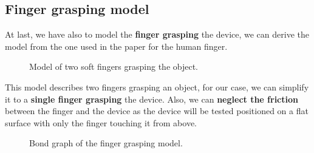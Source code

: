 \subsection{Finger grasping model}
\begin{samepage}
    At last, we have also to model the \textbf{finger grasping} the device, we can derive the model from the one used in the paper \cite{Finger_grasping_model} for the human finger.
    \nopagebreak

    \begin{figure}[H]
        \centering
        \caption{Model of two soft fingers grasping the object.}
        \label{fig: Finger_grasping_model}
    \end{figure}
\end{samepage}

This model describes two fingers grasping an object, for our case, we can simplify it to a \textbf{single finger grasping} the device.
Also, we can \textbf{neglect the friction} between the finger and the device as the device will be tested positioned on a flat surface with only the finger touching it from above.
\begin{figure}[H]
    \centering
    \resizebox{.45\linewidth}{!}{
        
    }
    \caption{Bond graph of the finger grasping model.}
    \label{fig: Finger_grasping_bond_graph}
\end{figure}
